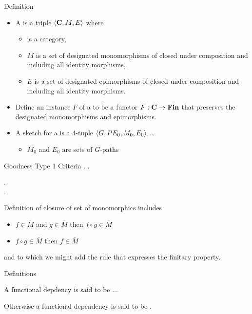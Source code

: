 


\begin{frame}{Definition}
\begin{itemize}
\item A \term{\catMEterm} is a triple $\langle\textbf{C},M,E\rangle$ where 
\begin{itemize}
\item \catcw is a category,
\item $M$ is a set of designated monomorphisms of \catcw closed under composition and including all identity morphisms,
\item $E$ is a set of designated epimorphisms of \catcw closed under composition and including all identity morphisms.
\end{itemize}
\item Define an instance $F$ of a \catMEterm to be a functor $F: \textbf{C} \rightarrow \textbf{Fin}$ 
that preserves the designated monomorphisms and epimorphisms.


\item A sketch for a \catMEterm is a 4-tuple $\langle G,PE_0,M_0,E_0\rangle$ ...
\begin{itemize}
 \item   $M_0$ and $E_0$ are sets of $G$-paths  
\end{itemize}
\end{itemize}
\end{frame}


\begin{frame}{Goodness Type 1 Criteria}
\medskip
\goodnessoneA.
\medskip
\goodnessoneB.

\goodnessoneC. \\
\medskip
\goodnessoneD. \\
\medskip

Definition of closure of set of monomorphics includes
\begin{itemize}
\item $f \in \overline{M}$ and $g \in \overline{M}$ then $f \circ g \in \overline{M}$
\item $f \circ g \in \overline{M}$ then $f \in \overline{M}$
\end{itemize}
and to which we might add the rule that expresses the finitary property.
\end{frame}

\begin{frame}{Definitions}

A functional depdency is said to be  ...

Otherwise a functional dependency is said to be .
\end{frame}


